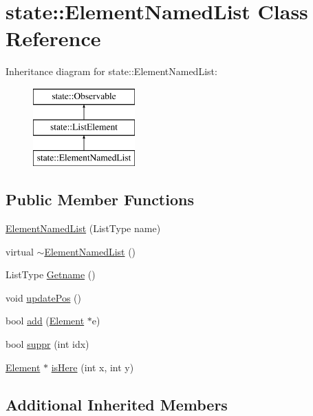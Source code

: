 \hypertarget{classstate_1_1_element_named_list}{}\section{state\+:\+:Element\+Named\+List Class Reference}
\label{classstate_1_1_element_named_list}
Inheritance diagram for state\+:\+:Element\+Named\+List\+:\begin{figure}[H]
\begin{center}
\leavevmode
\includegraphics[height=3.000000cm]{classstate_1_1_element_named_list}
\end{center}
\end{figure}
\subsection*{Public Member Functions}
\begin{DoxyCompactItemize}
\item 
\hyperlink{classstate_1_1_element_named_list_a233b7af7b1421ef71f562746a068049f}{Element\+Named\+List} (List\+Type name)
\item 
virtual \hyperlink{classstate_1_1_element_named_list_acbc647aa8ded664094ffbc47ab14178b}{$\sim$\+Element\+Named\+List} ()
\item 
List\+Type \hyperlink{classstate_1_1_element_named_list_a7a85fde8e5274020221ef1f521b9d2ea}{Getname} ()
\item 
void \hyperlink{classstate_1_1_element_named_list_a8f16293821685af35edfc3f77be55a5f}{update\+Pos} ()
\item 
bool \hyperlink{classstate_1_1_element_named_list_aa343185b2217042714b7020320166da9}{add} (\hyperlink{classstate_1_1_element}{Element} $\ast$e)
\item 
bool \hyperlink{classstate_1_1_element_named_list_a96b53623f9c61dd9867718b87f20ff03}{suppr} (int idx)
\item 
\hyperlink{classstate_1_1_element}{Element} $\ast$ \hyperlink{classstate_1_1_element_named_list_acd3748ad2d2f1d593f0c79508f067641}{is\+Here} (int x, int y)
\end{DoxyCompactItemize}
\subsection*{Additional Inherited Members}


